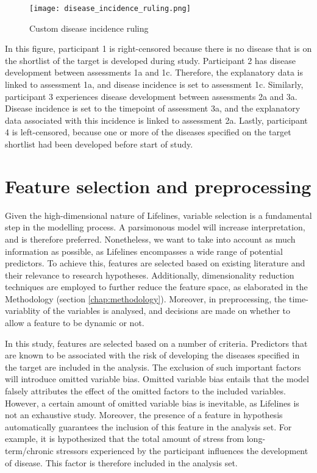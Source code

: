 \begin{figure}[H]
    \centering
    \texttt{[image: disease\_incidence\_ruling.png]}
    \caption{Custom disease incidence ruling}
    \label{fig:data:disease_incidence_ruling}
  \end{figure}

In this figure, participant 1 is right-censored because there is no disease that is on the shortlist of the target is developed during study. Participant 2 has disease development between assessments 1a and 1c. Therefore, the explanatory data is linked to assessment 1a, and disease incidence is set to assessment 1c. Similarly, participant 3 experiences disease development between assessments 2a and 3a. Disease incidence is set to the timepoint of assessment 3a, and the explanatory data associated with this incidence is linked to assessment 2a. Lastly, participant 4 is left-censored, because one or more of the diseases specified on the target shortlist had been developed before start of study. 

\section{Feature selection and preprocessing}
\label
{section:data:feature_selection_and_preprocessing}
Given the high-dimensional nature of Lifelines, variable selection is a fundamental step in the modelling process. A parsimonous model will increase interpretation, and is therefore preferred. Nonetheless, we want to take into account as much information as possible, as Lifelines encompasses a wide range of potential predictors. To achieve this, features are selected based on existing literature and their relevance to research hypotheses. Additionally, dimensionality reduction techniques are employed to further reduce the feature space, as elaborated in the Methodology (section \ref{chap:methodology}). Moreover, in preprocessing, the time-variablity of the variables is analysed, and decisions are made on whether to allow a feature to be dynamic or not. 

In this study, features are selected based on a number of criteria. Predictors that are known to be associated with the risk of developing the diseases specified in the target are included in the analysis. The exclusion of such important factors will introduce omitted variable bias. Omitted variable bias entails that the model falsely attributes the effect of the omitted factors to the included variables. However, a certain amount of omitted variable bias is inevitable, as Lifelines is not an exhaustive study. Moreover, the presence of a feature in hypothesis automatically guarantees the inclusion of this feature in the analysis set. For example, it is hypothesized that the total amount of stress from long-term/chronic stressors experienced by the participant influences the development of disease. This factor is therefore included in the analysis set. 

